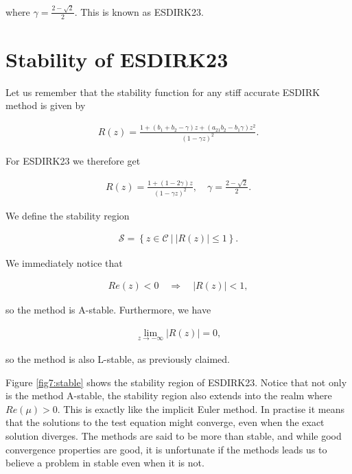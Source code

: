 where $\gamma = \frac{2- \sqrt{2}}{2}$. This is known as ESDIRK23. 

\section{Stability of ESDIRK23}
Let us remember that the stability function for any stiff accurate ESDIRK method is given by\cite{dotdot2018} 

\begin{align}
    R(z)=\frac{1+\left(b_{1}+b_{2}-\gamma\right) z+\left(a_{21} b_{2}-b_{1} \gamma\right) z^{2}}{(1-\gamma z)^{2}}.
\end{align}

For ESDIRK23 we therefore get

\begin{align}
    R(z)=\frac{1+\left( 1 - 2 \gamma\right) z}{(1-\gamma z)^{2}}, \quad \gamma = \frac{2- \sqrt{2}}{2}.
\end{align}

We define the stability region

\begin{align}
    \mathcal{S} = \left \{ z \in \mathcal{C} \ | \ | R(z) | \leq 1 \right \}.
\end{align}

We immediately notice that 

\begin{align}
    Re(z)<0 \quad \Rightarrow \quad |R(z)|<1,
\end{align}

so the method is A-stable. Furthermore, we have

\begin{align}
    \lim_{z \rightarrow -\infty} |R(z)| = 0,
\end{align}

so the method is also L-stable, as previously claimed. 

Figure \ref{fig7:stable} shows the stability region of ESDIRK23. Notice that not only is the method A-stable, the stability region also extends into the realm where $Re(\mu)>0$. This is exactly like the implicit Euler method. In practise it means that the solutions to the test equation might converge, even when the exact solution diverges. The methods are said to be more than stable, and while good convergence properties are good, it is unfortunate if the methods leads us to believe a problem in stable even when it is not. 

